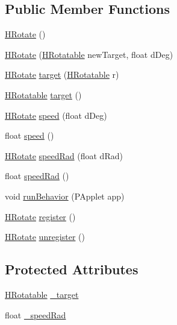 \subsection*{Public Member Functions}
\begin{DoxyCompactItemize}
\item 
\hyperlink{classhype_1_1behavior_1_1_h_rotate_adfa1d9db1ac4c9c765aa5eba75ecc76d}{H\-Rotate} ()
\item 
\hyperlink{classhype_1_1behavior_1_1_h_rotate_a445e41b4faf1f1960c857a01fdec1b03}{H\-Rotate} (\hyperlink{interfacehype_1_1interfaces_1_1_h_rotatable}{H\-Rotatable} new\-Target, float d\-Deg)
\item 
\hyperlink{classhype_1_1behavior_1_1_h_rotate}{H\-Rotate} \hyperlink{classhype_1_1behavior_1_1_h_rotate_aadc86b852d80f55fdf5b8d4b79181238}{target} (\hyperlink{interfacehype_1_1interfaces_1_1_h_rotatable}{H\-Rotatable} r)
\item 
\hyperlink{interfacehype_1_1interfaces_1_1_h_rotatable}{H\-Rotatable} \hyperlink{classhype_1_1behavior_1_1_h_rotate_a80a8496b98f75284b75b51b71bba337d}{target} ()
\item 
\hyperlink{classhype_1_1behavior_1_1_h_rotate}{H\-Rotate} \hyperlink{classhype_1_1behavior_1_1_h_rotate_a3870901ba57cec0f868ac49c79c893ed}{speed} (float d\-Deg)
\item 
float \hyperlink{classhype_1_1behavior_1_1_h_rotate_aa7fee0ca504f3c826af59e2702a92d63}{speed} ()
\item 
\hyperlink{classhype_1_1behavior_1_1_h_rotate}{H\-Rotate} \hyperlink{classhype_1_1behavior_1_1_h_rotate_af885a495a263305d37ddf593247fa66b}{speed\-Rad} (float d\-Rad)
\item 
float \hyperlink{classhype_1_1behavior_1_1_h_rotate_ace262138ac083d1a30fd043be87544b8}{speed\-Rad} ()
\item 
void \hyperlink{classhype_1_1behavior_1_1_h_rotate_ac4a2819434de5dd46a504daa1091690a}{run\-Behavior} (P\-Applet app)
\item 
\hyperlink{classhype_1_1behavior_1_1_h_rotate}{H\-Rotate} \hyperlink{classhype_1_1behavior_1_1_h_rotate_a6eb051237ab08371594724ecce89d813}{register} ()
\item 
\hyperlink{classhype_1_1behavior_1_1_h_rotate}{H\-Rotate} \hyperlink{classhype_1_1behavior_1_1_h_rotate_a0ff42539a4246ef9bc2235fc391d43b7}{unregister} ()
\end{DoxyCompactItemize}
\subsection*{Protected Attributes}
\begin{DoxyCompactItemize}
\item 
\hyperlink{interfacehype_1_1interfaces_1_1_h_rotatable}{H\-Rotatable} \hyperlink{classhype_1_1behavior_1_1_h_rotate_a820318c2953c93624ab29ebe3f3e6182}{\-\_\-target}
\item 
float \hyperlink{classhype_1_1behavior_1_1_h_rotate_a5061f65cfd851f59f492ae6324eb7df6}{\-\_\-speed\-Rad}
\end{DoxyCompactItemize}


